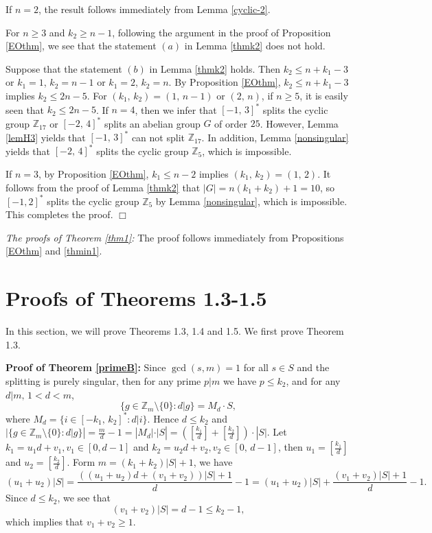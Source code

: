 \documentclass[12pt]{article}
\newtheorem{open problem}{Open problem}[section]
\newenvironment{proof}{\trivlist
      \item[\hskip\labelsep
      {\itshape Proof.}]\normalfont}
      {\hspace*{\fill}$\Box$\endtrivlist}
\begin{document}
\begin{proof}
If $n=2$, the result follows immediately from Lemma \ref{cyclic-2}.

For $n\geq 3$ and  $k_2\geq n-1$, following  the argument in the proof of Proposition \ref{EOthm}, we see that the statement $(a)$ in Lemma \ref{thmk2} does not hold.

Suppose that the statement $(b)$ in Lemma \ref{thmk2} holds.
Then $k_2\leq n+k_1-3$ or $k_1=1$, $k_2=n-1$ or $k_1=2$, $k_2=n$.
By Proposition \ref{EOthm}, $k_2\leq n+k_1-3$ implies $k_2\leq 2n-5$.
For $(k_1, \,k_2)=(1, \,n-1)$ or $(2, \,n)$,
if $n\geq 5$, it is easily seen that $k_2\leq 2n-5$.
If $n=4$, then we infer that $[-1, \,3]^*$ splits the cyclic group $\mathbb{Z}_{17}$
or $[-2, \,4]^\ast$ splits an abelian group $G$ of order $25$.
However, Lemma \ref{lemH3} yields that $[-1, \,3]^*$ can not split $\mathbb{Z}_{17}$.
In addition, Lemma \ref{nonsingular} yields that $[-2, \,4]^*$ splits the cyclic group $\mathbb{Z}_5$, which is impossible.

If $n=3$, by Proposition \ref{EOthm}, $k_1\leq n-2$ implies $(k_1, \,k_2)=(1, \,2)$.
It follows from the proof of Lemma \ref{thmk2} that $|G|=n(k_1+k_2)+1=10$, so $[-1, 2]^\ast$ splits the cyclic group $\mathbb{Z}_5$ by Lemma \ref{nonsingular}, which is impossible.
This completes the proof.
\end{proof}

\textit{The proofs of Theorem \ref{thm1}:} The proof follows immediately from Propositions \ref{EOthm} and \ref{thmin1}.

\section{Proofs of Theorems 1.3-1.5}

In this section, we will prove Theorems 1.3, 1.4 and 1.5. We first prove Theorem 1.3.

{\bf Proof of Theorem \ref{primeB}:}
Since $\gcd(s,m)=1$ for all $s\in S$ and the splitting is purely singular,  then for any prime $p|m$ we have $p\le k_2$,  and for any $d|m, \, 1<d<m$,
$$\{g\in \mathbb{Z}_{m}\setminus \{0\}: d|g\}=M_{d}\cdot S, $$
where $M_d=\{i\in [-k_1, \,k_2]^\ast: d|i\}$.
Hence $d\le k_2$ and $|\{g\in \mathbb{Z}_{m}\setminus \{0\}: d|g\}|=\frac{m}{d}-1=|M_{d}|\cdot |S|=([\frac{k_1}{d}]+[\frac{k_2}{d}])\cdot |S|$.
Let $k_1=u_1d+v_1, v_1\in [0, d-1]$ and $k_2=u_2d+v_2, v_2\in [0, \,d-1]$, then $u_1=[\frac{k_1}{d}]$ and $u_2=[\frac{k_2}{d}]$.
Form $m=(k_1+k_2)|S|+1$, we have
$$(u_1+u_2)|S|=\frac{((u_1+u_2)d+(v_1+v_2))|S|+1}{d}-1=(u_1+u_2)|S|+\frac{(v_1+v_2)|S|+1}{d}-1.$$
Since $d\le k_2$, we see that $$(v_1+v_2)|S|=d-1\leq k_2-1,$$ which implies that $v_1+v_2\geq 1.$
\end{document}
